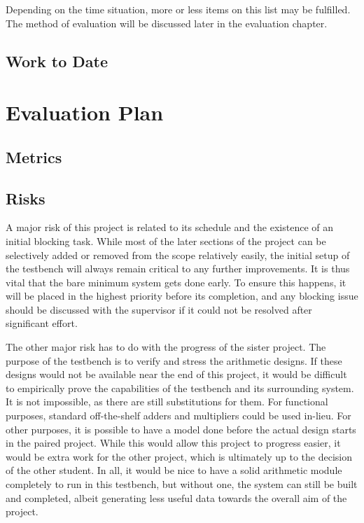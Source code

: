 \documentclass[journal]{IEEEtran}
\begin{document}
Depending on the time situation, more or less items on this list may be fulfilled.
The method of evaluation will be discussed later in the evaluation chapter.

\subsection{Work to Date}


\section{Evaluation Plan}

\subsection{Metrics}

\subsection{Risks}
A major risk of this project is related to its schedule and the existence of an
initial blocking task.
While most of the later sections of the project can be selectively added or
removed from the scope relatively easily, the initial setup of the testbench
will always remain critical to any further improvements.
It is thus vital that the bare minimum system gets done early.
To ensure this happens, it will be placed in the highest priority before its
completion, and any blocking issue should be discussed with the supervisor if it
could not be resolved after significant effort.

The other major risk has to do with the progress of the sister project.
The purpose of the testbench is to verify and stress the arithmetic designs.
If these designs would not be available near the end of this project,
it would be difficult to empirically prove the capabilities of the testbench
and its surrounding system.
It is not impossible, as there are still substitutions for them.
For functional purposes, standard off-the-shelf adders and multipliers could be
used in-lieu.
For other purposes, it is possible to have a model done before the actual design
starts in the paired project.
While this would allow this project to progress easier, it would be extra work
for the other project, which is ultimately up to the decision of the other
student.
In all, it would be nice to have a solid arithmetic module completely to run
in this testbench, but without one, the system can still be built and completed,
albeit generating less useful data towards the overall aim of the project.
\end{document}
